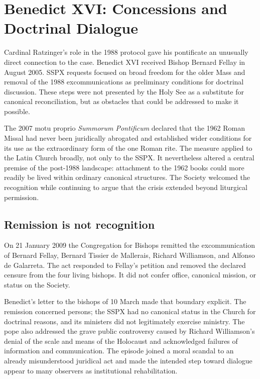 \section{Benedict XVI: Concessions and Doctrinal Dialogue}

Cardinal Ratzinger's role in the 1988 protocol gave his pontificate an unusually direct connection to the case. Benedict XVI received Bishop Bernard Fellay in August 2005. SSPX requests focused on broad freedom for the older Mass and removal of the 1988 excommunications as preliminary conditions for doctrinal discussion. These steps were not presented by the Holy See as a substitute for canonical reconciliation, but as obstacles that could be addressed to make it possible.

The 2007 motu proprio \emph{Summorum Pontificum} declared that the 1962 Roman Missal had never been juridically abrogated and established wider conditions for its use as the extraordinary form of the one Roman rite. The measure applied to the Latin Church broadly, not only to the SSPX. It nevertheless altered a central premise of the post-1988 landscape: attachment to the 1962 books could more readily be lived within ordinary canonical structures. The Society welcomed the recognition while continuing to argue that the crisis extended beyond liturgical permission.

\subsection{Remission is not recognition}

On 21 January 2009 the Congregation for Bishops remitted the excommunication of Bernard Fellay, Bernard Tissier de Mallerais, Richard Williamson, and Alfonso de Galarreta. The act responded to Fellay's petition and removed the declared censure from the four living bishops. It did not confer office, canonical mission, or status on the Society.

Benedict's letter to the bishops of 10 March made that boundary explicit. The remission concerned persons; the SSPX had no canonical status in the Church for doctrinal reasons, and its ministers did not legitimately exercise ministry. The pope also addressed the grave public controversy caused by Richard Williamson's denial of the scale and means of the Holocaust and acknowledged failures of information and communication. The episode joined a moral scandal to an already misunderstood juridical act and made the intended step toward dialogue appear to many observers as institutional rehabilitation.

